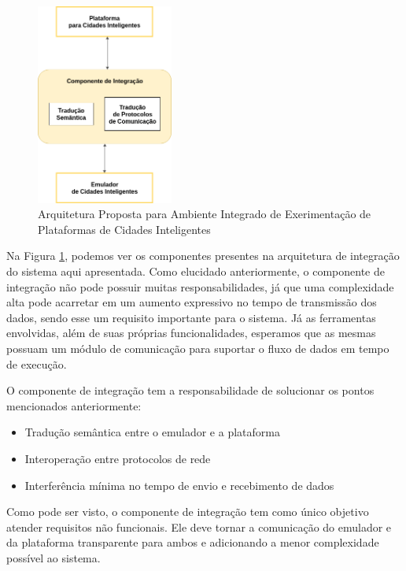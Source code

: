 \begin{figure}[ht]
	\centering
	\includegraphics[width=0.4\textwidth]{figuras/integration-general-architecture.png}
	\caption{Arquitetura Proposta para Ambiente Integrado de Exerimentação de Plataformas de Cidades Inteligentes}
	\label{fig:general_architecture}
\end{figure}


Na Figura \ref{fig:general_architecture}, podemos ver os componentes presentes na arquitetura de integração do sistema aqui apresentada.
Como elucidado anteriormente, o componente de integração não pode possuir muitas responsabilidades, já que uma complexidade alta pode acarretar em um aumento expressivo no
tempo de transmissão dos dados, sendo esse um requisito importante para o sistema.
Já as ferramentas envolvidas, além de suas próprias funcionalidades, esperamos que as mesmas possuam um módulo de comunicação para suportar o fluxo de dados em tempo de execução.

O componente de integração tem a responsabilidade de solucionar os pontos mencionados anteriormente:

\begin{itemize}
    \item Tradução semântica entre o emulador e a plataforma

    \item Interoperação entre protocolos de rede

    \item Interferência mínima no tempo de envio e recebimento de dados
\end{itemize}

Como pode ser visto, o componente de integração tem como único objetivo atender requisitos não funcionais.
Ele deve tornar a comunicação do emulador e da plataforma transparente para ambos e adicionando a menor complexidade possível ao sistema.


